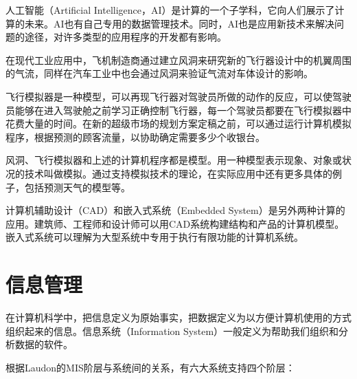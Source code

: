 人工智能（Artificial Intelligence，AI）是计算的一个子学科，它向人们展示了计算的未来。AI也有自己专用的数据管理技术。同时，AI也是应用新技术来解决问题的途径，对许多类型的应用程序的开发都有影响。

在现代工业应用中，飞机制造商通过建立风洞来研究新的飞行器设计中的机翼周围的气流，同样在汽车工业中也会通过风洞来验证气流对车体设计的影响。

飞行模拟器是一种模型，可以再现飞行器对驾驶员所做的动作的反应，可以使驾驶员能够在进入驾驶舱之前学习正确控制飞行器，每一个驾驶员都要在飞行模拟器中花费大量的时间。在新的超级市场的规划方案定稿之前，可以通过运行计算机模拟程序，根据预测的顾客流量，以协助确定需要多少个收银台。

风洞、飞行模拟器和上述的计算机程序都是模型。用一种模型表示现象、对象或状况的技术叫做模拟。通过支持模拟技术的理论，在实际应用中还有更多具体的例子，包括预测天气的模型等。

计算机辅助设计（CAD）和嵌入式系统（Embedded System）是另外两种计算的应用。建筑师、工程师和设计师可以用CAD系统构建结构和产品的计算机模型。嵌入式系统可以理解为大型系统中专用于执行有限功能的计算机系统。

\chapter{信息管理}

在计算机科学中，把信息定义为原始事实，把数据定义为以方便计算机使用的方式组织起来的信息。信息系统（Information System）一般定义为帮助我们组织和分析数据的软件。

根据Laudon的MIS阶层与系统间的关系，有六大系统支持四个阶层：

